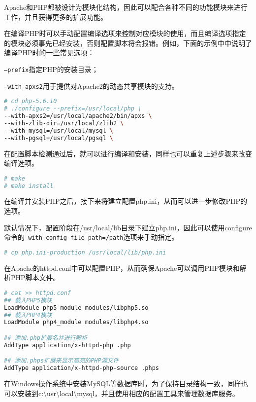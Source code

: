 Apache和PHP都被设计为模块化结构，因此可以配合各种不同的功能模块来进行工作，并且获得更多的扩展功能。

在编译PHP时可以手动配置编译选项来控制对应模块的使用，而且编译选项指定的模块必须事先已经安装，否则配置脚本将会报错。例如，下面的示例中中说明了编译PHP时的一些常见选项：

\begin{compactitem}
\item \texttt{--prefix}指定PHP的安装目录；
\item \texttt{--with-apxs2}用于提供对Apache2的动态共享模块的支持。
\end{compactitem}


\begin{lstlisting}[language=bash]
# cd php-5.6.10
# ./configure --prefix=/usr/local/php \
--with-apxs2=/usr/local/apache2/bin/apxs \
--with-zlib-dir=/usr/local/zlib2 \
--with-mysql=/usr/local/mysql \
--with-pgsql=/usr/local/pgsql \
\end{lstlisting}

在配置脚本检测通过后，就可以进行编译和安装，同样也可以重复上述步骤来改变编译选项。

\begin{lstlisting}[language=bash]
# make
# make install
\end{lstlisting}

在编译并安装PHP之后，接下来将建立配置php.ini，从而可以进一步修改PHP的选项。

默认情况下，配置阶段在/usr/local/lib目录下建立php.ini，因此可以使用configure命令的\texttt{--with-config-file-path=/path}选项来手动指定。

\begin{lstlisting}[language=bash]
# cp php.ini-production /usr/local/lib/php.ini
\end{lstlisting}


在Apache的httpd.conf中可以配置PHP，从而确保Apache可以调用PHP模块和解析PHP脚本文件。

\begin{lstlisting}[language=bash]
# cat >> httpd.conf
## 载入PHP5模块
LoadModule php5_module modules/libphp5.so
## 载入PHP4模块
LoadModule php4_module modules/libphp4.so

## 添加.php扩展名并进行解析
AddType application/x-httpd-php .php

## 添加.phps扩展来显示高亮的PHP源文件
AddType application/x-httpd-php-source .phps
\end{lstlisting}

在Windows操作系统中安装MySQL等数据库时，为了保持目录结构一致，同样也可以安装到c:\textbackslash usr\textbackslash local\textbackslash mysql，并且使用相应的配置工具来管理数据库服务。


